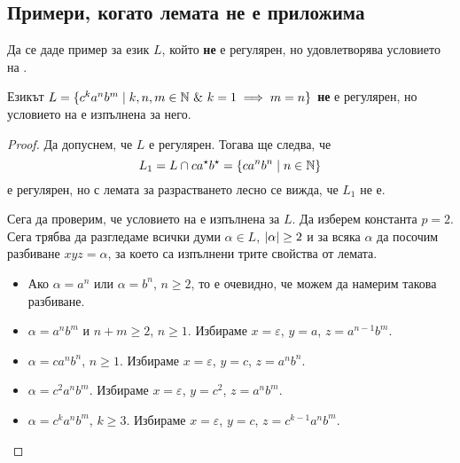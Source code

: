 \subsection*{Примери, когато лемата не е  приложима}

\begin{problem}
  Да се даде пример за език $L$, който {\bf не} е регулярен, но удовлетворява
  условието на .
\end{problem}



\begin{problem}
  Езикът $L = \{c^ka^nb^m\mid k,n,m \in \Nat\ \&\ k = 1\implies m = n\}$
  {\bf не} е регулярен, но условието на   е изпълнена за него.
\end{problem}
\begin{proof}
  Да допуснем, че $L$ е регулярен.
  Тогава ще следва, че 
  \[L_1 = L\cap ca^\star b^\star = \{ca^nb^n \mid n\in\mathbb{N}\}\]
  е регулярен,
  но с лемата за разрастването лесно се вижда, че $L_1$ не е.

  Сега да проверим, че условието на  е изпълнена за $L$.
  Да изберем константа $p = 2$.
  Сега трябва да разгледаме всички думи $\alpha \in L$, $\vert{\alpha}\vert \geq 2$
  и за всяка $\alpha$ да посочим разбиване $xyz = \alpha$, за което са изпълнени трите свойства от лемата.

  \begin{itemize}
  \item
    Ако $\alpha = a^n$ или $\alpha = b^n$, $n\geq 2$, то е  очевидно, че можем да
    намерим такова разбиване.
  \item
    $\alpha = a^nb^m$ и $n+m \geq 2$, $n \geq 1$.
    Избираме $x = \varepsilon$, $y = a$, $z = a^{n-1}b^m$.
  \item
    $\alpha = ca^nb^n$, $n\geq 1$.
    Избираме $x = \varepsilon$, $y = c$, $z = a^nb^n$.
  \item
    $\alpha = c^2a^nb^m$. 
    Избираме $x = \varepsilon$, $y = c^2$, $z = a^nb^m$.
  \item
    $\alpha = c^ka^nb^m$, $k \geq 3$.
    Избираме $x = \varepsilon$, $y = c$, $z = c^{k-1}a^nb^m$.
  \end{itemize}
\end{proof}


